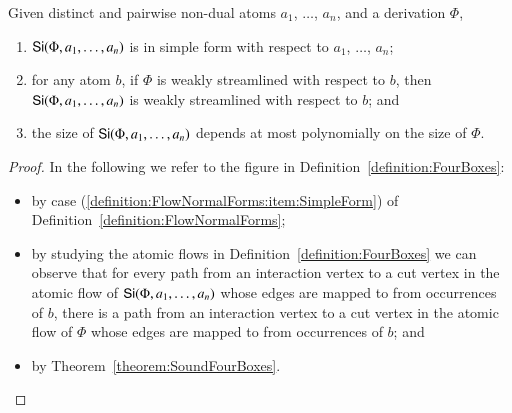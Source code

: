 \begin{proposition}\label{proposition:Simplifier}
Given distinct and pairwise non-dual atoms $a_1$, $\dots$, $a_n$, and a derivation $\Phi$,
\begin{enumerate}
\item $\mathsf{Si}(\Phi,a_1,\dots,a_n)$ is in simple form with respect to $a_1$, $\dots$, $a_n$;
\item for any atom $b$, if\/ $\Phi$ is weakly streamlined with respect to $b$, then\/ $\mathsf{Si}(\Phi,a_1,\dots,a_n)$ is weakly streamlined with respect to $b$; and
\item the size of\/ $\mathsf{Si}(\Phi,a_1,\dots,a_n)$ depends at most polynomially on the size of\/ $\Phi$.
\end{enumerate}
\end{proposition}

\begin{proof}
In the following we refer to the figure in Definition~\vref{definition:FourBoxes}:
\begin{itemize}
\item by case (\ref{definition:FlowNormalForms:item:SimpleForm}) of Definition~\vref{definition:FlowNormalForms};
\item by studying the atomic flows in Definition~\ref{definition:FourBoxes} we can observe that for every path from an interaction vertex to a cut vertex in the atomic flow of $\mathsf{Si}(\Phi,a_1,\dots,a_n)$ whose edges are mapped to from occurrences of $b$, there is a path from an interaction vertex to a cut vertex in the atomic flow of $\Phi$ whose edges are mapped to from occurrences of $b$; and
\item by Theorem~\vref{theorem:SoundFourBoxes}.
\end{itemize}
\end{proof}
